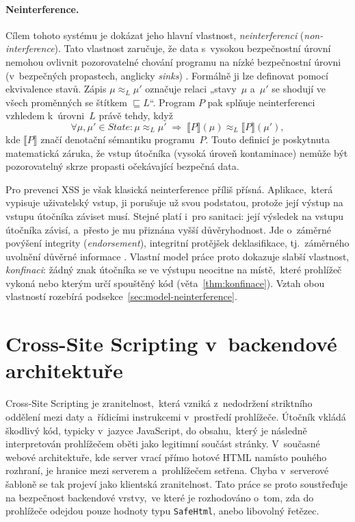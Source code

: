 \paragraph{Neinterference.}
Cílem tohoto systému je dokázat jeho hlavní vlastnost, \emph{neinterferenci} (\emph{non-interference}). Tato vlastnost zaručuje, že data s~vysokou bezpečnostní úrovní nemohou ovlivnit pozorovatelné chování programu na nízké bezpečnostní úrovni (v~bezpečných propastech, anglicky \emph{sinks}) \parencite{goguen1982security}. Formálně ji lze definovat pomocí ekvivalence stavů. Zápis $\mu \approx_L \mu'$ označuje relaci „stavy~$\mu$ a~$\mu'$ se shodují ve všech proměnných se štítkem $\sqsubseteq L$“. Program $P$ pak splňuje neinterferenci vzhledem k~úrovni~$L$ právě tehdy, když
\begin{equation}
    \forall \mu, \mu' \in \mathit{State} : \mu \approx_L \mu' \;\Longrightarrow\; \llbracket P \rrbracket(\mu) \approx_L \llbracket P \rrbracket(\mu'),
    \label{eq:noninterference}
\end{equation}
kde $\llbracket P \rrbracket$ značí denotační sémantiku programu~$P$. Touto definicí je poskytnuta matematická záruka, že vstup útočníka (vysoká úroveň kontaminace) nemůže být pozorovatelný skrze propasti očekávající bezpečná data.

Pro prevenci XSS je však klasická neinterference příliš přísná. Aplikace,~která vypisuje uživatelský vstup, ji porušuje už svou podstatou, protože její výstup na vstupu útočníka záviset musí. Stejné platí i~pro sanitaci: její výsledek na vstupu útočníka závisí, a~přesto je mu přiznána vyšší důvěryhodnost. Jde o~záměrné povýšení integrity (\emph{endorsement}), integritní protějšek deklasifikace, tj.~záměrného uvolnění důvěrné informace \parencite{zdancewic2003robust,sabelfeld2009declassification}. Vlastní model práce proto dokazuje slabší vlastnost, \emph{konfinaci}: žádný znak útočníka se ve výstupu neocitne na místě,~které prohlížeč vykoná nebo kterým určí spouštěný kód (věta~\ref{thm:konfinace}). Vztah obou vlastností rozebírá podsekce~\ref{sec:model-neinterference}.

\section{Cross-Site Scripting v~backendové architektuře}

Cross-Site Scripting je zranitelnost,~která vzniká z~nedodržení striktního oddělení mezi daty a~řídicími instrukcemi v~prostředí prohlížeče. Útočník vkládá škodlivý kód, typicky v~jazyce JavaScript, do obsahu,~který je následně interpretován prohlížečem oběti jako legitimní součást stránky. V~současné webové architektuře, kde server vrací přímo hotové HTML namísto pouhého rozhraní, je hranice mezi serverem a~prohlížečem setřena. Chyba v~serverové šabloně se tak projeví jako klientská zranitelnost. Tato práce se proto soustřeďuje na bezpečnost backendové vrstvy,~ve které je rozhodováno o~tom, zda do prohlížeče odejdou pouze hodnoty typu \texttt{SafeHtml}, anebo libovolný řetězec.

